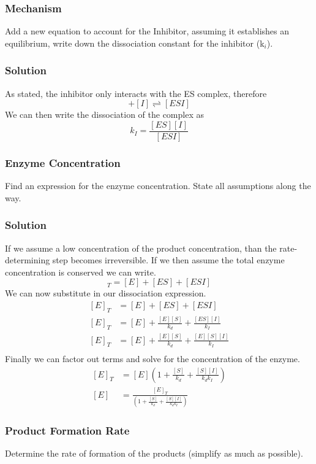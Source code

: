 \documentclass{article}
\newcommand{\be}{\begin{equation}}
\newcommand{\ee}{\end{equation}}
\begin{document}
\subsubsection{Mechanism}
Add a new equation to account for the Inhibitor, assuming it establishes an equilibrium, write down the dissociation constant for the inhibitor (k$_i$). 

\subsubsection*{Solution}
As stated, the inhibitor only interacts with the ES complex, therefore 
\be
[ES] + [I] \rightleftharpoons [ESI]
\ee
We can then write the dissociation of the complex as 
\be
k_I = \frac{[ES][I]}{[ESI]}
\ee

\subsubsection{Enzyme Concentration}
Find an expression for the enzyme concentration.
State all assumptions along the way. 

\subsubsection*{Solution}
If we assume a low concentration of the product concentration, than the rate-determining step becomes irreversible. 
If we then assume the total enzyme concentration is conserved we can write.
\be
[E]_T = [E] + [ES] + [ESI]
\ee
We can now substitute in our dissociation expression.
\be
\begin{split}
[E]_T &= [E] + [ES] + [ESI]\\
[E]_T &= [E] + \frac{[E][S]}{k_d} + \frac{[ES][I]}{k_I}\\
[E]_T &= [E] + \frac{[E][S]}{k_d} + \frac{[E][S][I]}{k_I}\\
\end{split}
\ee
Finally we can factor out terms and solve for the concentration of the enzyme. 
\be
\begin{split}
[E]_T &= [E]\left(1+\frac{[S]}{k_d} + \frac{[S][I]}{k_dk_I}\right)\\
[E] &= \frac{[E]_T}{\left(1+\frac{[S]}{k_d} + \frac{[S][I]}{k_dk_I}\right)}
\end{split}
\ee

\subsubsection{Product Formation Rate}
Determine the rate of formation of the products (simplify as much as possible).
\end{document}
